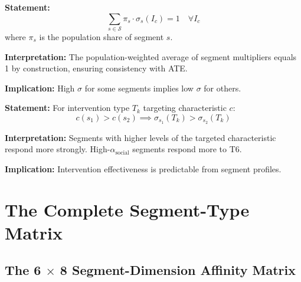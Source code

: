 \begin{tcolorbox}[colback=gray!5!white, colframe=gray!75!black,
    title=Axiom UNMAPPED_QQ-4: Weighted Average Consistency]
\textbf{Statement:}
\begin{equation}
\sum_{s \in \mathcal{S}} \pi_s \cdot \sigma_s(I_c) = 1 \quad \forall I_c
\end{equation}
where $\pi_s$ is the population share of segment $s$.

\textbf{Interpretation:} The population-weighted average of segment multipliers
equals 1 by construction, ensuring consistency with ATE.

\textbf{Implication:} High $\sigma$ for some segments implies low $\sigma$ for others.
\end{tcolorbox}

\begin{tcolorbox}[colback=gray!5!white, colframe=gray!75!black,
    title=Axiom UNMAPPED_QQ-5: Monotonicity in Segment Characteristic]
\textbf{Statement:} For intervention type $T_k$ targeting characteristic $c$:
\begin{equation}
c(s_1) > c(s_2) \implies \sigma_{s_1}(T_k) > \sigma_{s_2}(T_k)
\end{equation}

\textbf{Interpretation:} Segments with higher levels of the targeted characteristic
respond more strongly. High-$\alpha_{\text{social}}$ segments respond more to T6.

\textbf{Implication:} Intervention effectiveness is predictable from segment profiles.
\end{tcolorbox}


\section{The Complete Segment-Type Matrix}
\label{sec:qq-matrix}

\subsection{The 6 $\times$ 8 Segment-Dimension Affinity Matrix}

